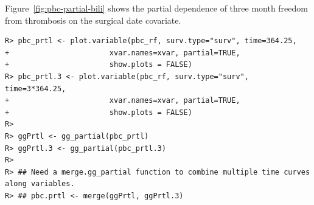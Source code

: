 \documentclass[nojss]{jss}\usepackage[]{graphicx}\usepackage[]{color}
\makeatletter
\newenvironment{kframe}{%
 \def\at@end@of@kframe{}%
 \ifinner\ifhmode%
  \def\at@end@of@kframe{\end{minipage}}%
  \begin{minipage}{\columnwidth}%
 \fi\fi%
 \def\FrameCommand##1{\hskip\@totalleftmargin \hskip-\fboxsep
 \colorbox{shadecolor}{##1}\hskip-\fboxsep
     \hskip-\linewidth \hskip-\@totalleftmargin \hskip\columnwidth}%
 \MakeFramed {\advance\hsize-\width
   \@totalleftmargin\z@ \linewidth\hsize
   \@setminipage}}%
 {\par\unskip\endMakeFramed%
 \at@end@of@kframe}
\newenvironment{knitrout}{}{} %
\makeatother
\begin{document}
Figure~\ref{fig:pbc-partial-bili} shows the partial dependence of three month freedom from thrombosis on the surgical date covariate. 

\begin{knitrout}\footnotesize
{}\color{fgcolor}\begin{kframe}
\begin{verbatim}
R> pbc_prtl <- plot.variable(pbc_rf, surv.type="surv", time=364.25, 
+                       xvar.names=xvar, partial=TRUE,
+                       show.plots = FALSE)
R> pbc_prtl.3 <- plot.variable(pbc_rf, surv.type="surv", time=3*364.25, 
+                       xvar.names=xvar, partial=TRUE,
+                       show.plots = FALSE)
R> 
R> ggPrtl <- gg_partial(pbc_prtl)
R> ggPrtl.3 <- gg_partial(pbc_prtl.3)
R> 
R> ## Need a merge.gg_partial function to combine multiple time curves along variables.
R> ## pbc.prtl <- merge(ggPrtl, ggPrtl.3)
\end{verbatim}
\end{kframe}
\end{knitrout}
\end{document}
